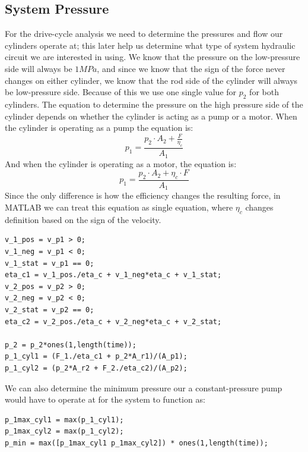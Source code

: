 \documentclass[12pt]{article}
\begin{document}
        \subsection{System Pressure}
        For the drive-cycle analysis we need to determine the pressures and flow our cylinders operate at; this later help us determine what type of system hydraulic circuit we are interested in using.
        We know that the pressure on the low-pressure side will always be $1 MPa$, and since we know that the sign of the force never changes on either cylinder, we know that the rod side of the cylinder will always be low-pressure side. Because of this we use one single value for $p_2$ for both cylinders.
        The equation to determine the pressure on the high pressure side of the cylinder depends on whether the cylinder is acting as a pump or a motor.
        When the cylinder is operating as a pump the equation is:
        \begin{equation*}
            p_1 = \frac{p_2\cdot A_2 + \frac{F}{\eta_c}}{A_1}
        \end{equation*}
        And when the cylinder is operating as a motor, the equation is:
        \begin{equation*}
            p_1 = \frac{p_2\cdot A_2 + \eta_c\cdot F}{A_1}
        \end{equation*}
        Since the only difference is how the efficiency changes the resulting force, in MATLAB we can treat this equation as single equation, where $\eta_c$ changes definition based on the sign of the velocity.\\
        \begin{lstlisting}
v_1_pos = v_p1 > 0;
v_1_neg = v_p1 < 0;
v_1_stat = v_p1 == 0;
eta_c1 = v_1_pos./eta_c + v_1_neg*eta_c + v_1_stat;
v_2_pos = v_p2 > 0;
v_2_neg = v_p2 < 0;
v_2_stat = v_p2 == 0;
eta_c2 = v_2_pos./eta_c + v_2_neg*eta_c + v_2_stat;

p_2 = p_2*ones(1,length(time));
p_1_cyl1 = (F_1./eta_c1 + p_2*A_r1)/(A_p1);
p_1_cyl2 = (p_2*A_r2 + F_2./eta_c2)/(A_p2);
        \end{lstlisting}
        We can also determine the minimum pressure our a constant-pressure pump would have to operate at for the system to function as:\\
        \begin{lstlisting}
p_1max_cyl1 = max(p_1_cyl1);
p_1max_cyl2 = max(p_1_cyl2);
p_min = max([p_1max_cyl1 p_1max_cyl2]) * ones(1,length(time));
        \end{lstlisting}
\end{document}
